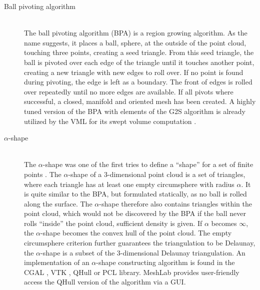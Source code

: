 \begin{description}
	\item[Ball pivoting algorithm] \hfill \\
	The ball pivoting algorithm (BPA) is a region growing algorithm.
	As the name suggests, it places a ball, \ie sphere, at the outside of the point cloud, touching three points, creating a seed triangle.
	From this seed triangle, the ball is pivoted over each edge of the triangle until it touches another point, creating a new triangle with new edges to roll over.
	If no point is found during pivoting, the edge is left as a boundary.
	The front of edges is rolled over repeatedly until no more edges are available.
	If all pivots where successful, a closed, manifold and oriented mesh has been created.
	A highly tuned version of the BPA with elements of the G2S algorithm is already utilized by the VML for its swept volume computation \cite{bpa_vml}.

	\item[$\alpha$-shape] \hfill \\
	The $\alpha$-shape was one of the first tries to define a \enquote{shape} for a set of finite points \cite{alpha_shape}.
	The $\alpha$-shape of a 3-dimensional point cloud is a set of triangles, where each triangle has at least one empty circumsphere with radius $\alpha$.
	It is quite similar to the BPA, but formulated statically, as no ball is rolled along the surface.
	The $\alpha$-shape therefore also contains triangles within the point cloud, which would not be discovered by the BPA if the ball never rolls \enquote{inside} the point cloud, \ie sufficient density is given.
	If $\alpha$ becomes $\infty$, the $\alpha$-shape becomes the convex hull of the point cloud.
	The empty circumsphere criterion further guarantees the triangulation to be Delaunay, \ie the $\alpha$-shape is a subset of the 3-dimensional Delaunay triangulation.
	An implementation of an $\alpha$-shape constructing algorithm is found in \eg the CGAL \cite{cgal_3d_alpha_shapes}, VTK \cite{vtk}, QHull \cite{qhull} or PCL \cite{pcl} library.
	MeshLab provides user-friendly access the QHull version of the algorithm via a GUI.


\end{description}
